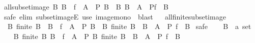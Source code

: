\begin{isabellebody}
\isamarkupfalse%
%
\endisatagproof
{\isafoldproof}%
%
\isadelimproof
\isanewline
%
\endisadelimproof
\isanewline
{}\isamarkupfalse%
\ all{\isacharunderscore}{\kern0pt}subset{\isacharunderscore}{\kern0pt}image{\isacharcolon}{\kern0pt}\ {\isachardoublequoteopen}{\isacharparenleft}{\kern0pt}{\isasymforall}B{\isachardot}{\kern0pt}\ B\ {\isasymsubseteq}\ f\ {\isacharbackquote}{\kern0pt}\ A\ {\isasymlongrightarrow}\ P\ B{\isacharparenright}{\kern0pt}\ {\isasymlongleftrightarrow}\ {\isacharparenleft}{\kern0pt}{\isasymforall}B{\isachardot}{\kern0pt}\ B\ {\isasymsubseteq}\ A\ {\isasymlongrightarrow}\ P{\isacharparenleft}{\kern0pt}f\ {\isacharbackquote}{\kern0pt}\ B{\isacharparenright}{\kern0pt}{\isacharparenright}{\kern0pt}{\isachardoublequoteclose}\isanewline
%
\isadelimproof
\ \ %
\endisadelimproof
%
\isatagproof
{}\isamarkupfalse%
\ {\isacharparenleft}{\kern0pt}safe\ elim{\isacharbang}{\kern0pt}{\isacharcolon}{\kern0pt}\ subset{\isacharunderscore}{\kern0pt}imageE{\isacharparenright}{\kern0pt}\ {\isacharparenleft}{\kern0pt}use\ image{\isacharunderscore}{\kern0pt}mono\ \ {\isacartoucheopen}blast{\isacharplus}{\kern0pt}{\isacartoucheclose}{\isacharparenright}{\kern0pt}%
\endisatagproof
{\isafoldproof}%
%
\isadelimproof
%
\endisadelimproof
\ \isanewline
\isanewline
{}\isamarkupfalse%
\ all{\isacharunderscore}{\kern0pt}finite{\isacharunderscore}{\kern0pt}subset{\isacharunderscore}{\kern0pt}image{\isacharcolon}{\kern0pt}\isanewline
\ \ {\isachardoublequoteopen}{\isacharparenleft}{\kern0pt}{\isasymforall}B{\isachardot}{\kern0pt}\ finite\ B\ {\isasymand}\ B\ {\isasymsubseteq}\ f\ {\isacharbackquote}{\kern0pt}\ A\ {\isasymlongrightarrow}\ P\ B{\isacharparenright}{\kern0pt}\ {\isasymlongleftrightarrow}\ {\isacharparenleft}{\kern0pt}{\isasymforall}B{\isachardot}{\kern0pt}\ finite\ B\ {\isasymand}\ B\ {\isasymsubseteq}\ A\ {\isasymlongrightarrow}\ P\ {\isacharparenleft}{\kern0pt}f\ {\isacharbackquote}{\kern0pt}\ B{\isacharparenright}{\kern0pt}{\isacharparenright}{\kern0pt}{\isachardoublequoteclose}\isanewline
%
\isadelimproof
%
\endisadelimproof
%
\isatagproof
{}\isamarkupfalse%
\ safe\isanewline
\ \ \isamarkupfalse%
\ B\ {\isacharcolon}{\kern0pt}{\isacharcolon}{\kern0pt}\ {\isachardoublequoteopen}{\isacharprime}{\kern0pt}a\ set{\isachardoublequoteclose}\isanewline
\ \ \isamarkupfalse%
\ B{\isacharcolon}{\kern0pt}\ {\isachardoublequoteopen}finite\ B{\isachardoublequoteclose}\ {\isachardoublequoteopen}B\ {\isasymsubseteq}\ f\ {\isacharbackquote}{\kern0pt}\ A{\isachardoublequoteclose}\ \ P{\isacharcolon}{\kern0pt}\ {\isachardoublequoteopen}{\isasymforall}B{\isachardot}{\kern0pt}\ finite\ B\ {\isasymand}\ B\ {\isasymsubseteq}\ A\ {\isasymlongrightarrow}\ P\ {\isacharparenleft}{\kern0pt}f\ {\isacharbackquote}{\kern0pt}\ B{\isacharparenright}{\kern0pt}{\isachardoublequoteclose}\isanewline

\end{isabellebody}
